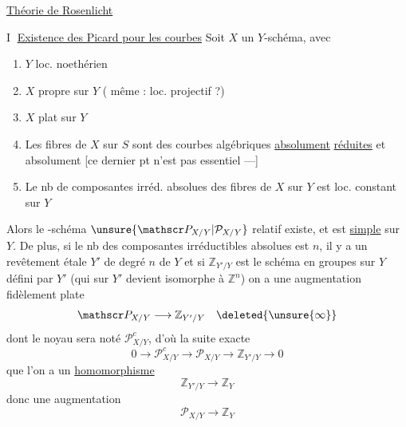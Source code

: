 \uline{Théorie de Rosenlicht}

\textcircled{I} \uline{Existence des Picard pour les courbes}
Soit $X$ un $Y$-schéma, avec

\begin{enumerate}[label=\alph*)]
\item $Y$ loc. noethérien
\item $X$ propre sur $Y$ ( même : loc. projectif ?)
\item $X$ plat sur $Y$
\item Les fibres de $X$ sur $S$ sont des courbes algébriques \uline{absolument}   \uline{réduites} et absolument  [ce dernier pt n'est pas essentiel ---]
\item Le nb de composantes  irréd. absolues des fibres de $X$ sur $Y$ est loc. constant sur $Y$
\end{enumerate}
Alors le -schéma $\unsure{\mathscr P_{X/Y}|\mathcal P_{X/Y}}$ relatif existe, et est \uline{simple} sur $Y$.
De plus, si le nb des composantes irréductibles absolues est $n$, il y a un revêtement  étale $Y'$ de degré $n$ de $Y$ et si $\mathbb Z_{Y'/Y}$ est le schéma en groupes  sur $Y$ défini par $Y'$ (qui sur $Y'$ devient isomorphe à $\mathbb Z^n$) on a une augmentation  fidèlement plate
\[
\mathscr P_{X/Y}\longrightarrow\mathbb Z_{Y'/Y}\quad\deleted{\unsure{\infty}}
\]
dont le noyau sera noté $\mathscr P_{X/Y}^c$, d'où la suite exacte
\[
0\longrightarrow\mathscr P_{X/Y}^c\longrightarrow\mathscr P_{X/Y}\longrightarrow\mathbb Z_{Y'/Y}\longrightarrow0
\]
 que l'on a un \uline{homomorphisme }
\[
\mathbb Z_{Y'/Y}\longrightarrow\mathbb Z_Y
\]
donc une augmentation
\[
\mathscr P_{X/Y}\longrightarrow\mathbb Z_Y
\]
